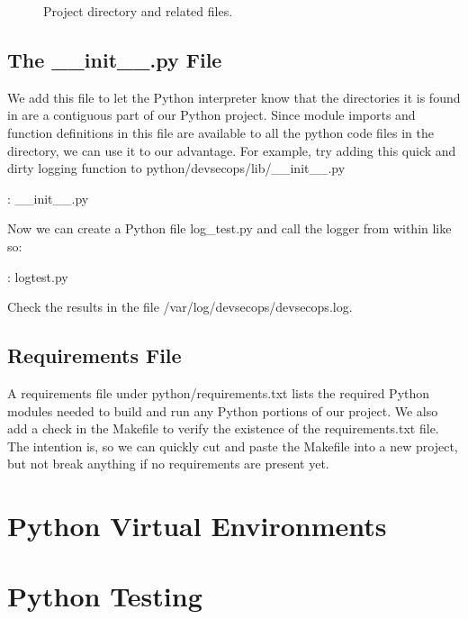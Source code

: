 \begin{figure}[!htb]
	\centering
	
	\caption{Project directory and related files.}
	\label{pythonfiles}
\end{figure}

\subsection{The \_\_init\_\_.py File}

\justifying
We add this file to let the Python interpreter know that the directories
it is found in are a contiguous part of our Python project. Since module
imports and function definitions in this file are available to all the
python code files in the directory, we can use it to our advantage. For
example, try adding this quick and dirty logging function to
python/devsecops/lib/\_\_init\_\_.py

\justifying
\begin{mybox}{\thetcbcounter: \_\_init\_\_.py}
  
\end{mybox}

\justifying
Now we can create a Python file log\_test.py and call the logger from within like so:

\begin{mybox}{\thetcbcounter: logtest.py}
  
\end{mybox}

\justifying
Check the results in the file /var/log/devsecops/devsecops.log.

\subsection{Requirements File}

\justifying
A requirements file under python/requirements.txt lists
the required Python modules needed to build and run any Python portions of our  project.
We also add a check in the Makefile to verify the existence of the requirements.txt file.
The intention is, so we can quickly cut and paste the Makefile into a new project, but
not break anything if no requirements are present yet.

\section{Python Virtual Environments}

\section{Python Testing}

